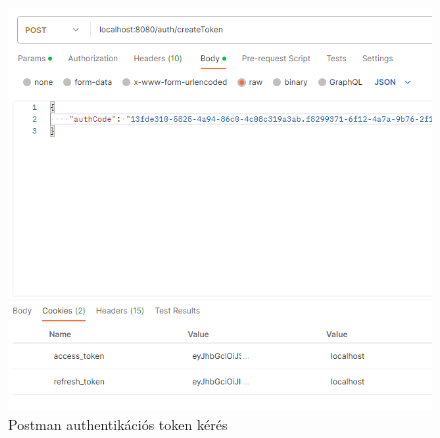 \documentclass[a4paper,twoside]{article}
\begin{document}
\begin{figure}[h]
	\caption{Postman authentikációs token kérés}
	\centering
	\includegraphics[scale=0.5]{getTokens}
\end{figure}
\newpage
\end{document}

